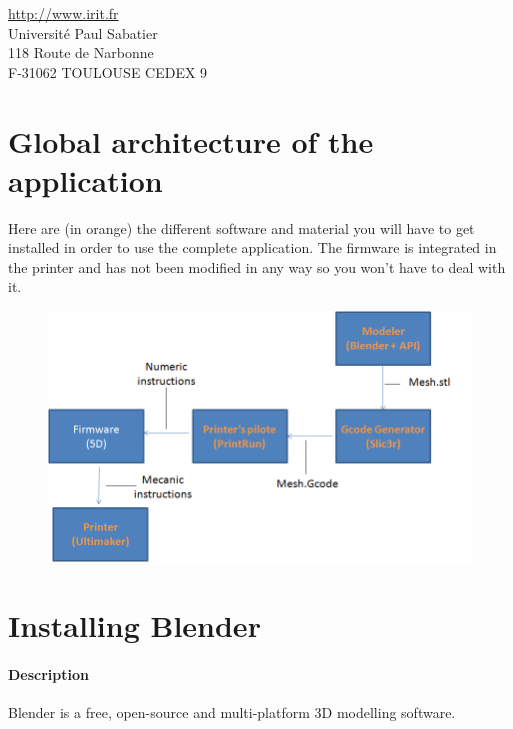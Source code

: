\documentclass{article}
\begin{document}
\begin{center}
\url{http://www.irit.fr}\\
Université Paul Sabatier \\
118 Route de Narbonne \\
F-31062 TOULOUSE CEDEX 9
\end{center}

\thispagestyle{empty}

\newpage

\tableofcontents

\newpage

\section{Global architecture of the application}

Here are (in orange) the different software and material you will have to get installed in order to use the complete application. The firmware is integrated in the printer and has not been modified in any way so you won't have to deal with it.

\begin{figure}[!h]
\begin{center}
	\includegraphics[scale=0.4]{ARD1}
\end{center}
\end{figure}

\newpage

\section{Installing Blender}

	\paragraph{Description} Blender is a free, open-source and multi-platform 3D modelling software.
\end{document}
